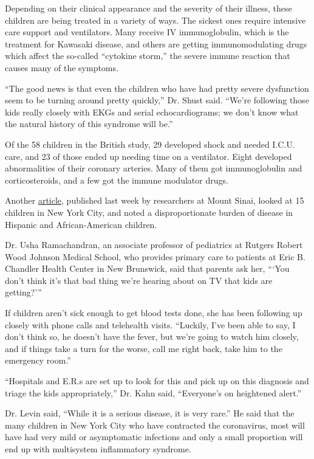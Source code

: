 Depending on their clinical appearance and the severity of their
illness, these children are being treated in a variety of ways. The
sickest ones require intensive care support and ventilators. Many
receive IV immunoglobulin, which is the treatment for Kawasaki disease,
and others are getting immunomodulating drugs which affect the so-called
``cytokine storm,'' the severe immune reaction that causes many of the
symptoms.

``The good news is that even the children who have had pretty severe
dysfunction seem to be turning around pretty quickly,'' Dr. Shust said.
``We're following those kids really closely with EKGs and serial
echocardiograms; we don't know what the natural history of this syndrome
will be.''

Of the 58 children in the British study, 29 developed shock and needed
I.C.U. care, and 23 of those ended up needing time on a ventilator.
Eight developed abnormalities of their coronary arteries. Many of them
got immunoglobulin and corticosteroids, and a few got the immune
modulator drugs.

Another
\href{https://onlinelibrary.wiley.com/doi/abs/10.1002/jmv.26224}{article},
published last week by researchers at Mount Sinai, looked at 15 children
in New York City, and noted a disproportionate burden of disease in
Hispanic and African-American children.

Dr. Usha Ramachandran, an associate professor of pediatrics at Rutgers
Robert Wood Johnson Medical School, who provides primary care to
patients at Eric B. Chandler Health Center in New Brunswick, said that
parents ask her, ```You don't think it's that bad thing we're hearing
about on TV that kids are getting?'''

If children aren't sick enough to get blood tests done, she has been
following up closely with phone calls and telehealth visits. ``Luckily,
I've been able to say, I don't think so, he doesn't have the fever, but
we're going to watch him closely, and if things take a turn for the
worse, call me right back, take him to the emergency room.''

``Hospitals and E.R.s are set up to look for this and pick up on this
diagnosis and triage the kids appropriately,'' Dr. Kahn said,
``Everyone's on heightened alert.''

Dr. Levin said, ``While it is a serious disease, it is very rare.'' He
said that the many children in New York City who have contracted the
coronavirus, most will have had very mild or asymptomatic infections and
only a small proportion will end up with multisystem inflammatory
syndrome.

